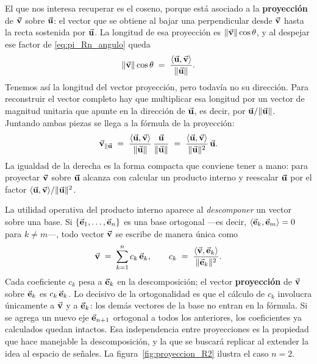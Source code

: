\documentclass[class=book, crop=false]{standalone}
\begin{document}
El que nos interesa recuperar es el coseno, porque está asociado a la \textbf{proyección} de $\vec{\mathbf{v}}$ sobre $\vec{\mathbf{u}}$: el vector que se obtiene al bajar una perpendicular desde $\vec{\mathbf{v}}$ hasta la recta sostenida por $\vec{\mathbf{u}}$. La longitud de esa proyección es $\|\vec{\mathbf{v}}\|\cos\theta$, y al despejar ese factor de \eqref{eq:pi_Rn_angulo} queda
\begin{equation}
    \|\vec{\mathbf{v}}\|\cos\theta \;=\; \frac{\langle \vec{\mathbf{u}},\vec{\mathbf{v}}\rangle}{\|\vec{\mathbf{u}}\|}.
    \label{eq:cos_theta}
\end{equation}
Tenemos así la longitud del vector proyección, pero todavía no su dirección. Para reconstruir el vector completo hay que multiplicar esa longitud por un vector de magnitud unitaria que apunte en la dirección de $\vec{\mathbf{u}}$, es decir, por $\vec{\mathbf{u}}/\|\vec{\mathbf{u}}\|$. Juntando ambas piezas se llega a la fórmula de la proyección:
\begin{equation}
    \vec{\mathbf{v}}_{\parallel \vec{\mathbf{u}}}
    \;=\; \frac{\langle \vec{\mathbf{u}},\vec{\mathbf{v}}\rangle}{\|\vec{\mathbf{u}}\|}\,\frac{\vec{\mathbf{u}}}{\|\vec{\mathbf{u}}\|}
    \;=\; \frac{\langle \vec{\mathbf{u}},\vec{\mathbf{v}}\rangle}{\|\vec{\mathbf{u}}\|^2}\,\vec{\mathbf{u}}.
    \label{eq:proyeccion_vu}
\end{equation}
La igualdad de la derecha es la forma compacta que conviene tener a mano: para proyectar $\vec{\mathbf{v}}$ sobre $\vec{\mathbf{u}}$ alcanza con calcular un producto interno y reescalar $\vec{\mathbf{u}}$ por el factor $\langle\vec{\mathbf{u}},\vec{\mathbf{v}}\rangle/\|\vec{\mathbf{u}}\|^2$.


La utilidad operativa del producto interno aparece al \textit{descomponer}
un vector sobre una base. Si $\{\vec{\mathbf{e}}_1,\ldots,\vec{\mathbf{e}}_n\}$ es una
base ortogonal —es decir, $\langle\vec{\mathbf{e}}_k,\vec{\mathbf{e}}_m\rangle = 0$
para $k \neq m$—, todo vector $\vec{\mathbf{v}}$ se escribe de manera única como
\begin{equation}
    \vec{\mathbf{v}} \;=\; \sum_{k=1}^{n} c_k\,\vec{\mathbf{e}}_k,
    \qquad
    c_k \;=\; \frac{\langle \vec{\mathbf{v}},\vec{\mathbf{e}}_k\rangle}{\|\vec{\mathbf{e}}_k\|^2}.
    \label{eq:coefs_ortogonal_Rn}
\end{equation}
Cada coeficiente $c_k$ pesa a $\vec{\mathbf{e}}_k$ en la descomposición; el vector
\textbf{proyección} de $\vec{\mathbf{v}}$ sobre $\vec{\mathbf{e}}_k$ es $c_k\,\vec{\mathbf{e}}_k$.
Lo decisivo de la ortogonalidad es que el cálculo de $c_k$
involucra únicamente a $\vec{\mathbf{v}}$ y a $\vec{\mathbf{e}}_k$: los demás vectores
de la base no entran en la fórmula. Si se agrega un nuevo eje
$\vec{\mathbf{e}}_{n+1}$ ortogonal a todos los anteriores, los coeficientes ya
calculados quedan intactos. Esa independencia entre proyecciones es la
propiedad que hace manejable la descomposición, y la que se buscará
replicar al extender la idea al espacio de señales. La
figura~\ref{fig:proyeccion_R2} ilustra el caso $n = 2$.
\end{document}
